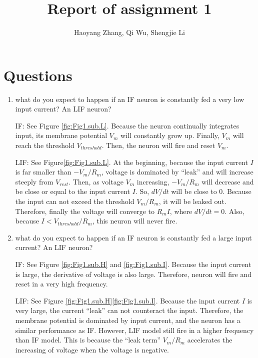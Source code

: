 \documentclass[11pt]{article}
\title{Report of assignment 1}
\author{Haoyang Zhang, Qi Wu, Shengjie Li}
\begin{document}
\maketitle

	\section*{Questions}
	\begin{enumerate}
		\item what do you expect to happen if an IF neuron is constantly fed a very low input current? An LIF neuron?
		
		IF: See Figure \ref{fig:Fig1.sub.L}. Because the neuron continually integrates input, its membrane potential $V_m$ will constantly grow up. Finally, $V_m$ will reach the threshold $V_{threshold}$. Then, the neuron will fire and reset $V_m$.
		
		LIF: See Figure\ref{fig:Fig1.sub.L}. At the beginning, because the input current $I$ is far smaller than $-V_m/R_m$, voltage is dominated by ``leak'' and will increase steeply from $V_{rest}$. Then, as voltage $V_m$ increasing, $-V_m/R_m$ will decrease and be close or equal to the input current $I$. So, $dV/dt$ will be close to 0. Because the input can not exceed the threshold $V_m/R_m$, it will be leaked out. Therefore, finally the voltage will converge to $R_mI$, where $dV/dt = 0$. Also, because $I < V_{threshold}/R_m$, this neuron will never fire.
		
		\item what do you expect to happen if an IF neuron is constantly fed a large input current? An LIF neuron?
			
		IF: See Figure \ref{fig:Fig1.sub.H} and \ref{fig:Fig1.sub.I}. Because the input current is large, the derivative of voltage is also large. Therefore, neuron will fire and reset in a very high frequency.
		
		LIF: See Figure \ref{fig:Fig1.sub.H}\ref{fig:Fig1.sub.I}. Because the input current $I$ is very large, the current ``leak'' can not counteract the input. Therefore, the membrane potential is dominated by input current, and the neuron has a similar performance as IF. However, LIF model still fire in a higher frequency than IF model. This is because the ``leak term'' $V_m/R_m$ accelerates the increasing of voltage when the voltage is negative.
				

\end{enumerate}
\end{document}
